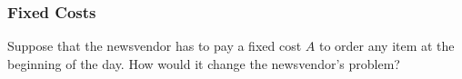 %
%
%

\subsubsection{Fixed Costs}

\begin{question}
Suppose that the newsvendor has to pay a fixed cost $A$ to order any item at the beginning of the day. How would it change the newsvendor's problem?
\end{question}

